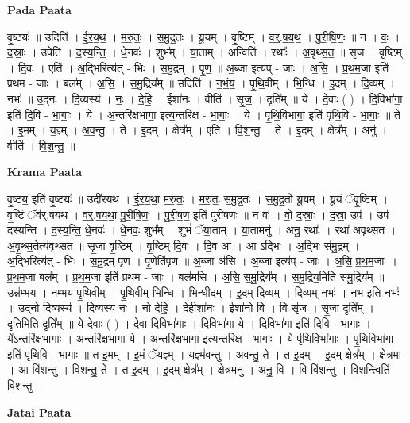 \documentclass[17pt]{extarticle}
\begin{document}
\textbf{Pada Paata} \newline

वृ॒ष्टयः॑ ॥ उदिति॑ । ई॒र॒य॒थ॒ । म॒रु॒तः॒ । स॒मु॒द्र॒तः । यू॒यम् । वृ॒ष्टिम् । व॒र्॒.ष॒य॒थ॒ । पु॒री॒षि॒णः॒ ॥ न । वः॒ । द॒स्राः॒ । उपेति॑ । द॒स्य॒न्ति॒ । धे॒नवः॑ ।   शुभ᳚म् । या॒ताम् । अन्विति॑ । रथाः᳚ । अ॒वृ॒थ्स॒त॒ ॥ सृ॒ज ।  वृ॒ष्टिम् । दि॒वः । एति॑ । अ॒द्भिरित्य॑त् - भिः । स॒मु॒द्रम् । पृ॒ण॒ ॥ अ॒ब्जा इत्य॑प् - जाः । अ॒सि॒ । प्र॒थ॒म॒जा इति॑ प्रथम - जाः । बल᳚म् । अ॒सि॒ । स॒मु॒द्रिय᳚म् ॥ उदिति॑ । न॒भं॒य॒ । पृ॒थि॒वीम् । भि॒न्धि । इ॒दम् । दि॒व्यम् । नभः॑ ॥ उ॒द्नः । दि॒व्यस्य॑ । नः॒ । दे॒हि॒ । ईशा॑नः । वीति॑ । सृ॒ज॒ । दृति᳚म् ॥ ये । दे॒वाः ( ) । दि॒विभा॑गा॒ इति॑ दि॒वि - भा॒गाः॒ । ये । अ॒न्तरि॑क्षभागा॒ इत्य॒न्तरि॑क्ष - भा॒गाः॒ । ये । पृ॒थि॒विभा॑गा॒ इति॑ पृथि॒वि - भा॒गाः॒ ॥ ते । इ॒मम् । य॒ज्ञ्म् । अ॒व॒न्तु॒ । ते । इ॒दम् । क्षेत्र᳚म् । एति॑ । वि॒श॒न्तु॒ । ते । इ॒दम् । क्षेत्र᳚म् । अनु॑ । वीति॑ । वि॒श॒न्तु॒ ॥  \newline


\textbf{Krama Paata} \newline

वृ॒ष्टय॒ इति॑ वृ॒ष्टयः॑ ॥ उदी॑रयथ । ई॒र॒य॒था॒ म॒रु॒तः॒ । म॒रु॒तः॒ स॒मु॒द्र॒तः । स॒मु॒द्र॒तो यू॒यम् । यू॒यं ॅवृ॒ष्टिम् । वृ॒ष्टिं ॅव॑र्.षयथ । व॒र्॒.ष॒य॒था॒ पु॒री॒षि॒णः॒ । पु॒री॒ष॒ण॒ इति॑ पुरीषणः ॥ न वः॑ । वो॒ द॒स्राः॒ । द॒स्रा॒ उप॑ । उप॑ दस्यन्ति । द॒स्य॒न्ति॒ धे॒नवः॑ । धे॒नवः॒ शुभ᳚म् । शुभं॑ ॅया॒ताम् । या॒तामनु॑ । अनु॒ रथाः᳚ । रथा॑ अवृथ्सत । अ॒वृ॒थ्स॒तेत्य॑वृथ्सत ॥ सृ॒जा वृ॒ष्टिम् । वृ॒ष्टिम् दि॒वः । दि॒व आ । आ ऽद्भिः । अ॒द्भिः स॑मु॒द्रम् । अ॒द्भिरित्य॑त् - भिः । स॒मु॒द्रम् पृ॑ण । पृ॒णेति॑पृण ॥ अ॒ब्जा अ॑सि । अ॒ब्जा इत्य॑प् - जाः । अ॒सि॒ प्र॒थ॒म॒जाः । प्र॒थ॒म॒जा बल᳚म् । प्र॒थ॒म॒जा इति॑ प्रथम - जाः । बल॑मसि । अ॒सि॒ स॒मु॒द्रिय᳚म् । स॒मु॒द्रिय॒मिति॑ समु॒द्रिय᳚म् ॥ उन्न॑म्भय । न॒म्भ॒य॒ पृ॒थि॒वीम् । पृ॒थि॒वीम् भि॒न्धि । भि॒न्धीदम् । इ॒दम् दि॒व्यम् । दि॒व्यम् नभः॑ । नभ॒ इति॒ नभः॑ ॥ उ॒द्नो दि॒व्यस्य॑ । दि॒व्यस्य॑ नः । नो॒ दे॒हि॒ । दे॒हीशा॑नः । ईशा॑नो॒ वि । वि सृ॑ज । सृ॒जा॒ दृति᳚म् । दृति॒मिति॒ दृति᳚म् ॥ ये दे॒वाः ( ) । दे॒वा दि॒विभा॑गाः । दि॒विभा॑गा॒ ये । दि॒विभा॑गा॒ इति॑ दि॒वि - भा॒गाः॒ । ये᳚ऽन्तरि॑क्षभागाः । अ॒न्तरि॑क्षभागा॒ ये । अ॒न्तरि॑क्षभागा॒ इत्य॒न्तरि॑क्ष - भा॒गाः॒ । ये पृ॑थि॒विभा॑गाः । पृ॒थि॒विभा॑गा॒ इति॑ पृथि॒वि - भा॒गाः॒ ॥ त इ॒मम् । इ॒मं ॅय॒ज्ञ्म् । य॒ज्ञ्म॑वन्तु । अ॒व॒न्तु॒ ते । त इ॒दम् । इ॒दम् क्षेत्र᳚म् । क्षेत्र॒मा । आ वि॑शन्तु । वि॒श॒न्तु॒ ते । त इ॒दम् । इ॒दम् क्षेत्र᳚म् । क्षेत्र॒मनु॑ । अनु॒ वि । वि वि॑शन्तु । वि॒श॒न्त्विति॑ विशन्तु । \newline

\textbf{Jatai Paata} \newline
\end{document}
